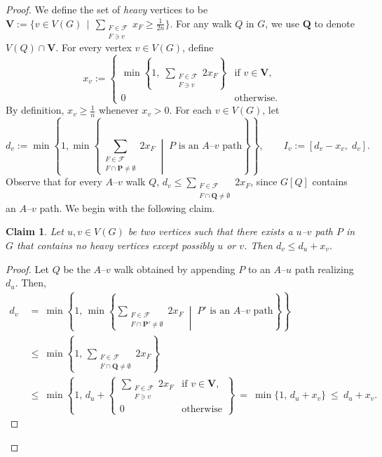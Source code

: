 \documentclass[11pt]{amsart}
\newtheorem{claim}{Claim}[theorem]
\begin{document}
\begin{proof}
    We define the set of \emph{heavy} vertices to be $ \mathbf{V} := \bigl\{ v \in V(G) \,\mid\, \sum_{\substack{F \in \mathcal{F} \\ F \ni v}} x_F \ge \frac{1}{2n} \bigr\}$. For any walk $Q$ in $G$, we use $\mathbf{Q}$ to denote $V(Q) \cap \mathbf{V}$.
    For every vertex $v \in V(G)$, define
    $$
    x_v :=
    \begin{cases}
    \min\!\left\{ 1,\; \sum_{\substack{F \in \mathcal{F} \\ F \ni v}} 2x_F \right\} & \text{if } v \in \mathbf{V},\\[4pt]
    0 & \text{otherwise}.
    \end{cases}
    $$
    By definition, $x_v \ge \frac{1}{n}$ whenever $x_v > 0$.
    For each $v \in V(G)$, let
    $$
    d_v := \min \left\{ 1, \min\left\{ \sum_{\substack{F \in \mathcal{F} \\ F \cap \mathbf{P} \neq \emptyset}} 2x_F \;\middle|\; P \text{ is an } A\text{--}v \text{ path} \right\} \right\},
    \qquad
    I_v := \left[ d_v - x_v,\; d_v \right].
    $$
    Observe that for every $A$--$v$ walk $Q$, $d_v \le \sum_{\substack{F \in \mathcal{F} \\ F \cap \mathbf{Q} \neq \emptyset}} 2x_F$, since $G[Q]$ contains an $A$--$v$ path. We begin with the following claim.
    \begin{claim}\label{claim:intervals_overlap}
        Let $u,v \in V(G)$ be two vertices such that there exists a $u$--$v$ path $P$ in $G$ that contains no heavy vertices except possibly $u$ or $v$. Then $d_v \le d_u + x_v$.
    \end{claim}
    \begin{proof}
        Let $Q$ be the $A$--$v$ walk obtained by appending $P$ to an $A$--$u$ path realizing $d_u$. Then,
        \begin{align*}
        d_v
        &\ =\ \min \left\{ 1,\, \min\left\{
            \sum_{\substack{F \in \mathcal{F} \\ F \cap \mathbf{P'} \neq \emptyset}} 2x_F
            \;\middle|\;
            P' \text{ is an } A\text{--}v \text{ path}
           \right\} \right\} \\
        &\ \leq\ \min \left\{1,\,
            \sum_{\substack{F \in \mathcal{F} \\ F \cap \mathbf{Q} \neq \emptyset}} 2x_F
            \right\}\\
        &\ \leq\ \min \left\{1,\, d_u +
            \begin{cases}
                \displaystyle
                \sum_{\substack{F \in \mathcal{F} \\ F \ni v}} 2x_F & \text{if } v \in \mathbf{V}, \\[6pt]
                0 & \text{otherwise}
            \end{cases}
            \right\}
         \ =\ \min\{1,\, d_u + x_v\}
         \ \leq\ d_u + x_v.
    \end{align*}


\end{proof}
\end{proof}
\end{document}
